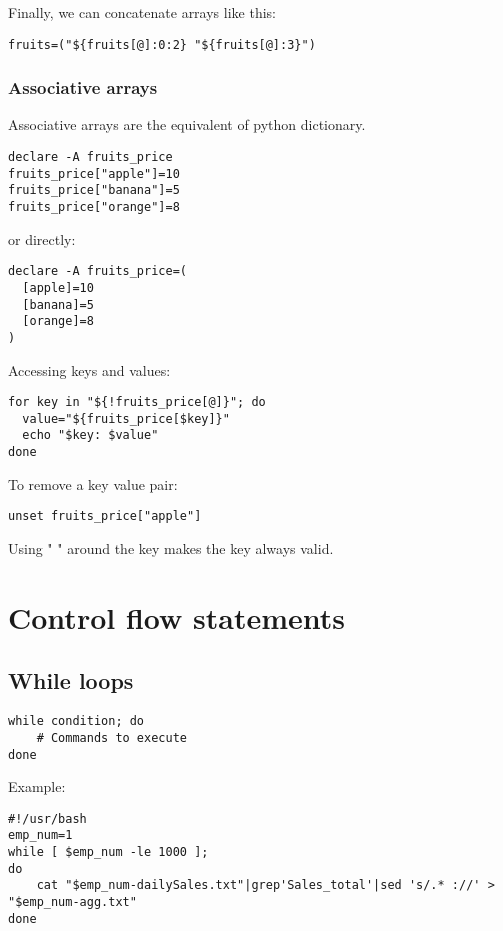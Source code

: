 \documentclass[24pt]{article}
\begin{document}
Finally, we can concatenate arrays like this:
\begin{lstlisting}
fruits=("${fruits[@]:0:2} "${fruits[@]:3}")
\end{lstlisting}



\subsubsection{Associative arrays}
Associative arrays are the equivalent of python dictionary.

\begin{lstlisting}
declare -A fruits_price
fruits_price["apple"]=10
fruits_price["banana"]=5
fruits_price["orange"]=8
\end{lstlisting}

or directly:
\begin{lstlisting}
declare -A fruits_price=(
  [apple]=10
  [banana]=5
  [orange]=8
)
\end{lstlisting}


Accessing keys and values: 
\begin{lstlisting}
for key in "${!fruits_price[@]}"; do
  value="${fruits_price[$key]}"
  echo "$key: $value"
done
\end{lstlisting}

To remove a key value pair:
\begin{lstlisting}
unset fruits_price["apple"]
\end{lstlisting}

Using " " around the key makes the key always valid.


\section{Control flow statements}

\subsection{While loops}

\begin{lstlisting}
while condition; do
    # Commands to execute
done
\end{lstlisting}

Example:

\begin{lstlisting}
#!/usr/bash
emp_num=1
while [ $emp_num -le 1000 ];
do
    cat "$emp_num-dailySales.txt"|grep'Sales_total'|sed 's/.* ://' > "$emp_num-agg.txt"
done
\end{lstlisting}
\end{document}
